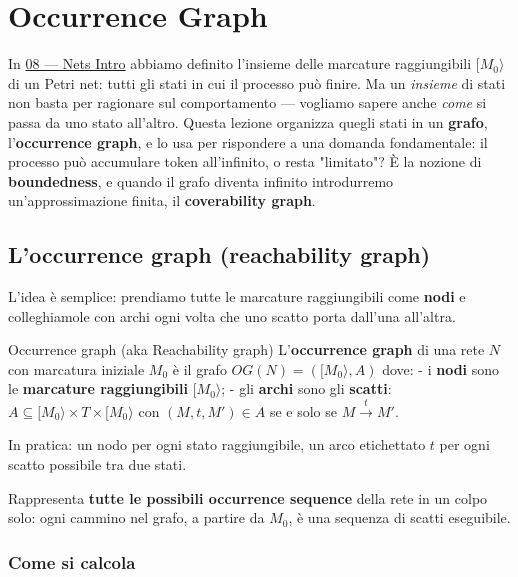 \chapter{\texorpdfstring{Occurrence Graph}{Occurrence Graph}}
\label{ch:09}

In \hyperref[ch:08]{08 — Nets Intro} abbiamo definito l'insieme delle marcature raggiungibili $[M_0\rangle$ di un Petri net: tutti gli stati in cui il processo può finire. Ma un \emph{insieme} di stati non basta per ragionare sul comportamento — vogliamo sapere anche \emph{come} si passa da uno stato all'altro. Questa lezione organizza quegli stati in un \textbf{grafo}, l'\textbf{occurrence graph}, e lo usa per rispondere a una domanda fondamentale: il processo può accumulare token all'infinito, o resta "limitato"? È la nozione di \textbf{boundedness}, e quando il grafo diventa infinito introdurremo un'approssimazione finita, il \textbf{coverability graph}.

\section{\texorpdfstring{L'occurrence graph (reachability graph)}{L'occurrence graph (reachability graph)}}

L'idea è semplice: prendiamo tutte le marcature raggiungibili come \textbf{nodi} e colleghiamole con archi ogni volta che uno scatto porta dall'una all'altra.

\begin{boxdefinition}{Occurrence graph (aka Reachability graph)}
L'\textbf{occurrence graph} di una rete $N$ con marcatura iniziale $M_0$ è il grafo $OG(N) = ([M_0\rangle, A)$ dove: - i \textbf{nodi} sono le \textbf{marcature raggiungibili} $[M_0\rangle$; - gli \textbf{archi} sono gli \textbf{scatti}: $A \subseteq [M_0\rangle \times T \times [M_0\rangle$ con $(M, t, M') \in A$ se e solo se $M \xrightarrow{t} M'$.

In pratica: un nodo per ogni stato raggiungibile, un arco etichettato $t$ per ogni scatto possibile tra due stati.
\end{boxdefinition}

Rappresenta \textbf{tutte le possibili occurrence sequence} della rete in un colpo solo: ogni cammino nel grafo, a partire da $M_0$, è una sequenza di scatti eseguibile.

\subsection{\texorpdfstring{Come si calcola}{Come si calcola}}

